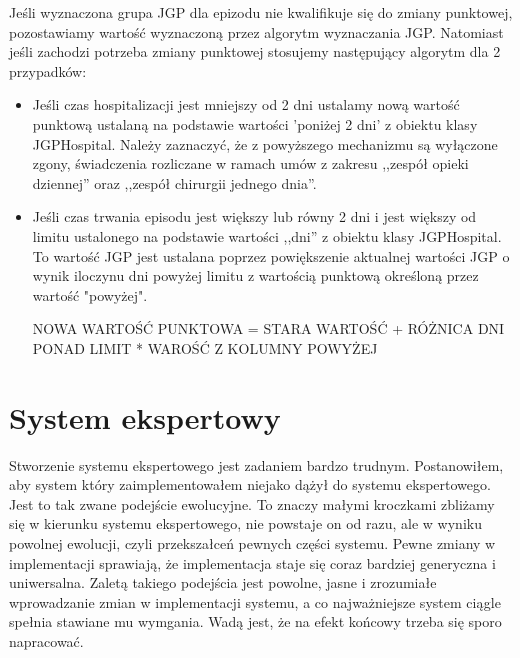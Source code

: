 Jeśli wyznaczona grupa JGP dla epizodu nie kwalifikuje się do zmiany punktowej, pozostawiamy wartość wyznaczoną przez algorytm wyznaczania JGP. Natomiast jeśli zachodzi potrzeba zmiany punktowej stosujemy następujący algorytm dla 2 przypadków:
\begin{itemize}
\item Jeśli czas hospitalizacji jest mniejszy od 2 dni ustalamy nową wartość punktową ustalaną na podstawie wartości 'poniżej 2 dni' z obiektu klasy JGPHospital. Należy zaznaczyć, że z powyższego mechanizmu są wyłączone zgony, świadczenia rozliczane w ramach umów z zakresu ,,zespół opieki dziennej'' oraz ,,zespół chirurgii jednego dnia''.
\item Jeśli czas trwania episodu jest większy lub równy 2 dni i jest większy od limitu ustalonego na podstawie wartości ,,dni'' z obiektu klasy JGPHospital. To wartość JGP jest ustalana poprzez powiększenie aktualnej wartości JGP o wynik iloczynu dni powyżej limitu z wartością punktową określoną przez wartość "powyżej".

NOWA WARTOŚĆ PUNKTOWA = STARA WARTOŚĆ + RÓŻNICA DNI PONAD LIMIT * WAROŚĆ Z KOLUMNY POWYŻEJ
\end{itemize} 

\section{System ekspertowy}
\label{sec:systemEkspertowy}

Stworzenie systemu ekspertowego jest zadaniem bardzo trudnym. Postanowiłem, aby system który zaimplementowałem niejako dążył do systemu ekspertowego. Jest to tak zwane podejście ewolucyjne. To znaczy małymi kroczkami zbliżamy się w kierunku systemu ekspertowego, nie powstaje on od razu, ale w wyniku powolnej ewolucji, czyli przekszałceń pewnych części systemu. Pewne zmiany w implementacji sprawiają, że implementacja staje się coraz bardziej generyczna i uniwersalna. Zaletą takiego podejścia jest powolne, jasne i zrozumiałe wprowadzanie zmian w implementacji systemu, a co najważniejsze system ciągle spełnia stawiane mu wymgania. Wadą jest, że na efekt końcowy trzeba się sporo napracować.

